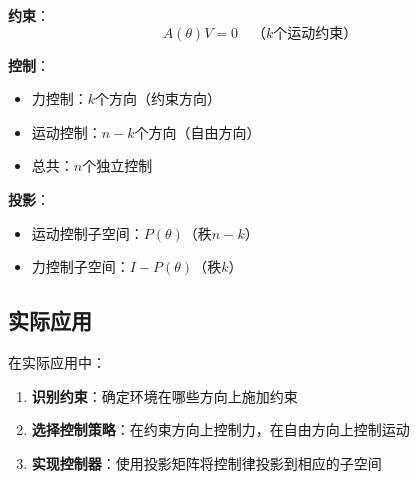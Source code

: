 \documentclass[12pt,a4paper]{article}
\begin{document}
\textbf{约束}：
\begin{equation}
A(\theta)V = 0 \quad \text{（$k$个运动约束）}
\end{equation}

\textbf{控制}：
\begin{itemize}
\item 力控制：$k$个方向（约束方向）
\item 运动控制：$n-k$个方向（自由方向）
\item 总共：$n$个独立控制
\end{itemize}

\textbf{投影}：
\begin{itemize}
\item 运动控制子空间：$P(\theta)$（秩$n-k$）
\item 力控制子空间：$I - P(\theta)$（秩$k$）
\end{itemize}

\subsection{实际应用}

在实际应用中：
\begin{enumerate}
\item \textbf{识别约束}：确定环境在哪些方向上施加约束
\item \textbf{选择控制策略}：在约束方向上控制力，在自由方向上控制运动
\item \textbf{实现控制器}：使用投影矩阵将控制律投影到相应的子空间
\end{enumerate}
\end{document}
